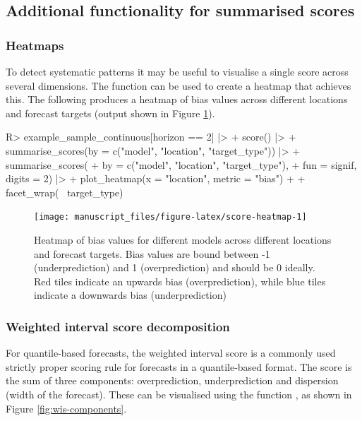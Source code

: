\documentclass[
]{jss}
\begin{document}
\subsection{Additional functionality for summarised
scores}\label{additional-functionality-for-summarised-scores}

\subsubsection{Heatmaps}\label{heatmaps}

To detect systematic patterns it may be useful to visualise a single
score across several dimensions. The function  can
be used to create a heatmap that achieves this. The following produces a
heatmap of bias values across different locations and forecast targets
(output shown in Figure \ref{fig:score-heatmap}).

\begin{CodeChunk}
\begin{CodeInput}
R> example_sample_continuous[horizon == 2] |>
+   score() |>
+   summarise_scores(by = c("model", "location", "target_type")) |>
+   summarise_scores(
+     by = c("model", "location", "target_type"), 
+     fun = signif, digits = 2) |>
+   plot_heatmap(x = "location", metric = "bias") + 
+     facet_wrap(~ target_type) 
\end{CodeInput}
\begin{figure}[!h]

{\centering \texttt{[image: manuscript\_files/figure-latex/score-heatmap-1]} 

}

\caption[Heatmap of bias values for different models across different locations and forecast targets]{Heatmap of bias values for different models across different locations and forecast targets. Bias values are bound between -1 (underprediction) and 1 (overprediction) and should be 0 ideally. Red tiles indicate an upwards bias (overprediction), while blue tiles indicate a downwards bias (underprediction)}\label{fig:score-heatmap}
\end{figure}
\end{CodeChunk}

\subsubsection{Weighted interval score
decomposition}\label{weighted-interval-score-decomposition}

For quantile-based forecasts, the weighted interval score
\citep[WIS, ][see Section \ref{sec:wis} in the Appendix]{bracherEvaluatingEpidemicForecasts2021}
is a commonly used strictly proper scoring rule for forecasts in a
quantile-based format. The score is the sum of three components:
overprediction, underprediction and dispersion (width of the forecast).
These can be visualised using the function , as shown
in Figure \ref{fig:wis-components}.
\end{document}
